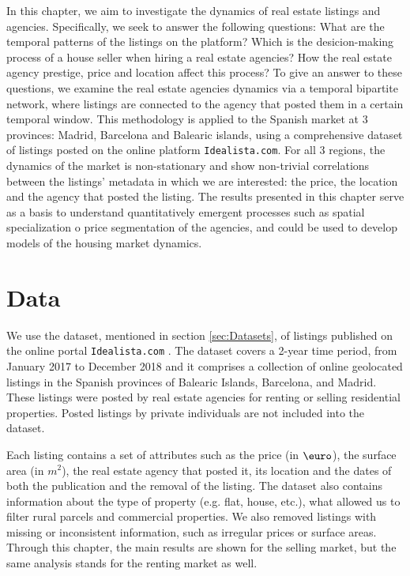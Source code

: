 In this chapter, we aim to investigate the dynamics of real estate listings and agencies. Specifically, we seek to answer the following questions: What are the temporal patterns of the listings on the platform? Which is the desicion-making process of a house seller when hiring a real estate agencies? How the real estate agency prestige, price and location affect this process? To give an answer to these questions, we examine the real estate agencies dynamics via a temporal bipartite network, where listings are connected to the agency that posted them in a certain temporal window. This methodology is applied to the Spanish market at 3 provinces: Madrid, Barcelona and Balearic islands, using a comprehensive dataset of listings posted on the online platform \texttt{Idealista.com}. For all 3 regions, the dynamics of the market is non-stationary and show non-trivial correlations between the listings' metadata in which we are interested: the price, the location and the agency that posted the listing. The results presented in this chapter serve as a basis to understand quantitatively emergent processes such as spatial specialization o price segmentation of the agencies, and could be used to develop models of the housing market dynamics.

\section{Data \label{sec:Data}}

We use the dataset, mentioned in section \ref{sec:Datasets}, of listings published on the online portal \texttt{Idealista.com} \cite{idealista}. The dataset covers a 2-year time period, from January 2017 to December 2018 and it comprises a collection of online geolocated listings in the Spanish provinces of Balearic Islands, Barcelona, and Madrid. These listings were posted by real estate agencies for renting or selling residential properties. Posted listings by private individuals are not included into the dataset.

Each listing contains a set of attributes such as the price (in $\textup{\euro}$), the surface area (in $m^2$), the real estate agency that posted it, its location and the dates of both the publication and the removal of the listing. The dataset also contains information about the type of property (e.g. flat, house, etc.), what allowed us to filter rural parcels and commercial properties. We also removed listings with missing or inconsistent information, such as irregular prices or surface areas. Through this chapter, the main results are shown for the selling market, but the same analysis stands for the renting market as well.

